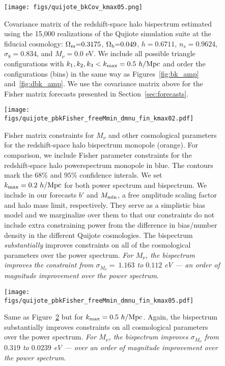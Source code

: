 \documentclass[12pt, letterpaper, preprint]{aastex62}
\newcommand{\Om}{\Omega_{\rm m}}
\newcommand{\Ob}{\Omega_{\rm b}}
\newcommand{\smnu}{M_\nu}
\newcommand{\sig}{\sigma_8}
\begin{document}
\begin{figure}
\begin{center}
    \texttt{[image: figs/quijote\_bkCov\_kmax05.png]} 
    \caption{Covariance matrix of the redshift-space halo bispectrum estimated 
    using the 15,000 realizations of the Qujiote simulation suite at the fiducial 
    cosmology: $\Om{=}0.3175$, $\Ob{=}0.049$, $h{=}0.6711$, $n_s{=}0.9624$, $\sig{=}0.834$, 
    and $\smnu{=}0.0$ eV. We include all possible triangle configurations with 
    $k_1, k_2, k_3 < k_{\rm max} = 0.5~h/{\rm Mpc}$ and order the configurations 
    (bins) in the same way as Figures~\ref{fig:bk_amp} and~\ref{fig:dbk_amp}. We 
    use the covariance matrix above for the Fisher matrix forecasts presented in 
    Section~\ref{sec:forecasts}. 
    }
\label{fig:bk_cov}
\end{center}
\end{figure}

\begin{figure}
\begin{center}
    \texttt{[image: figs/quijote\_pbkFisher\_freeMmin\_dmnu\_fin\_kmax02.pdf]}
    \caption{Fisher matrix constraints for $\smnu$ and other cosmological parameters 
    for the redshift-space halo bispectrum monopole (orange). For comparison, we 
    include Fisher parameter constraints for the redshift-space halo powerspectrum monopole 
    in blue. The contours mark the $68\%$ and $95\%$ confidence interals. We set 
    $k_{\rm max} = 0.2~h/{\rm Mpc}$ for both power spectrum and bispectrum. We 
    include in our forecasts $b'$ and $M_{\rm min}$, a free amplitude scaling factor
    and halo mass limit, respectively. They serve as a simplistic bias model and we 
    marginalize over them to that our constraints do not include extra constraining 
    power from the difference in bias/number density in the different Quijote cosmologies.
    The bispectrum {\em substantially} improves constraints on all of the cosmological parameters 
    over the power spectrum. {\em For $\smnu$, the bispectrum improves the constraint
    from $\sigma_{\smnu}{=}~1.163$ to $0.112$ eV --- an order of magnitude improvement 
    over the power spectrum}.}
\label{fig:bk_fish}
\end{center}
\end{figure}

\begin{figure}
\begin{center}
    \texttt{[image: figs/quijote\_pbkFisher\_freeMmin\_dmnu\_fin\_kmax05.pdf]}
    \caption{Same as Figure~\ref{fig:bk_fish} but for $k_{\rm max} = 0.5~h/{\rm Mpc}$.
    Again, the bispectrum substantially improves constraints on all cosmological parameters 
    over the power spectrum. {\em For $\smnu$, the bispectrum improves $\sigma_{\smnu}$ from 
    $0.319$ to $0.0239$ eV --- over an order of magnitude improvement over the power spectrum}.}
\label{fig:bk_fish_kmax}
\end{center}
\end{figure}
\end{document}
